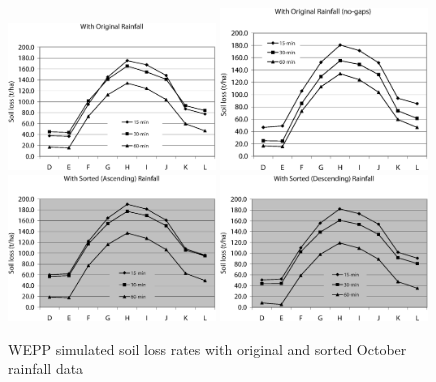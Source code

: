 \begin{figure}[htbp]
  \centering
    \includegraphics[width=0.49\textwidth]{./img/wepp_soilloss_with_original}
    \includegraphics[width=0.49\textwidth]
{./img/wepp_soilloss_with_original_nogap}\\[5mm]
    \includegraphics[width=0.49\textwidth]{./img/wepp_soilloss_with_sorted_asc}
    \includegraphics[width=0.49\textwidth]{./img/wepp_soilloss_with_sorted_des}
  \caption{WEPP simulated soil loss rates with original and sorted October
rainfall data}
  \label{fig:wepp_soilloss_results}
\end{figure}

